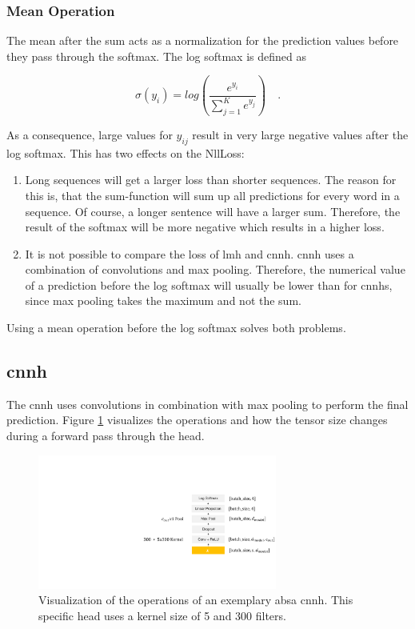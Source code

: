 \subsubsection*{Mean Operation}

The mean after the sum acts as a normalization for the prediction values before they pass through the softmax. The log softmax is defined as 

\begin{equation}
	\sigma(y_i)=log(\frac{e^{y_i}}{\sum_{j=1}^{K}e^{y_j}})\quad .
\end{equation}

As a consequence, large values for $y_{ij}$ result in very large negative values after the log softmax. This has two effects on the NllLoss:

\begin{enumerate}
	\item Long sequences will get a larger loss than shorter sequences. The reason for this is, that the sum-function will sum up all predictions for every word in a sequence. Of course, a longer sentence will have a larger sum. Therefore, the result of the softmax will be more negative which results in a higher loss.
	\item It is not possible to compare the loss of \gls{lmh} and \gls{cnnh}. \gls{cnnh} uses  a combination of convolutions and max pooling. Therefore, the numerical value of a prediction before the log softmax will usually be lower than for \glspl{cnnh}, since max pooling takes the maximum and not the sum.
\end{enumerate}

Using a mean operation before the log softmax solves both problems.

\subsection{\acrfull{cnnh}}
The \acrfull{cnnh} uses convolutions in combination with max pooling to perform the final prediction. Figure \ref{fig:04_ch1} visualizes the operations and how the tensor size changes during a forward pass through the head. 
\medskip
\begin{figure}[htp]
	\centering
	\includegraphics[width=0.7\textwidth]{figures/04_method/04_ch}
	\caption{Visualization of the operations of an exemplary \gls{absa} \acrfull{cnnh}. This specific head uses a kernel size of 5 and 300 filters.}
	\label{fig:04_ch1}
\end{figure}

